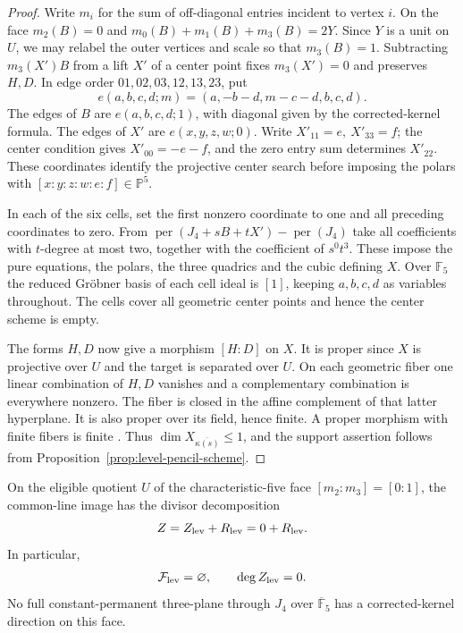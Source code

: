 \begin{proof}
Write \(m_i\) for the sum of off-diagonal entries incident to vertex
\(i\). On the face \(m_2(B)=0\) and \(m_0(B)+m_1(B)+m_3(B)=2Y\).
Since \(Y\) is a unit on \(U\), we may relabel the outer vertices and
scale so that \(m_3(B)=1\). Subtracting \(m_3(X')B\) from a lift
\(X'\) of a center point fixes \(m_3(X')=0\) and preserves \(H,D\).
In edge order \(01,02,03,12,13,23\), put
\[
 e(a,b,c,d;m)=(a,-b-d,m-c-d,b,c,d).
\]
The edges of \(B\) are \(e(a,b,c,d;1)\), with diagonal given by
the corrected-kernel formula. The edges of \(X'\) are
\(e(x,y,z,w;0)\). Write \(X'_{11}=e,\ X'_{33}=f\); the center
condition gives \(X'_{00}=-e-f\), and the zero entry sum determines
\(X'_{22}\). These coordinates identify the projective center search
before imposing the polars with \([x:y:z:w:e:f]\in\mathbb P^5\).

In each of the six cells, set the first nonzero coordinate to one
and all preceding coordinates to zero. From
\(\operatorname{per}(J_4+sB+tX')-\operatorname{per}(J_4)\)
take all coefficients with \(t\)-degree at most two, together with the
coefficient of \(s^0t^3\). These impose the pure equations, the polars,
the three quadrics and the cubic defining \(X\). Over \(\mathbb F_5\)
the reduced Gröbner basis of each cell ideal is \([1]\), keeping
\(a,b,c,d\) as variables throughout. The cells cover all geometric
center points and hence the center scheme is empty.

The forms \(H,D\) now give a morphism \([H:D]\) on \(X\).
It is proper since \(X\) is projective over \(U\) and the target is
separated over \(U\). On each geometric fiber one linear combination
of \(H,D\) vanishes and a complementary combination is everywhere
nonzero. The fiber is closed in the affine complement of that latter
hyperplane. It is also proper over its field, hence finite.
A proper morphism with finite fibers is finite
\cite{stacksproperaffine,stacksProperFiniteFibers}. Thus
\(\dim X_{\overline{\kappa(s)}}\le1\), and the support assertion follows
from Proposition~\ref{prop:level-pencil-scheme}.
\end{proof}

\begin{theorem}
\label{thm:fixed-face-level-empty}
On the eligible quotient \(U\) of the characteristic-five face
\([m_2:m_3]=[0:1]\), the common-line image has the divisor decomposition
\[
           Z=Z_{\rm lev}+R_{\rm lev}=0+R_{\rm lev}.
\]
In particular,
\[
   \mathcal F_{\rm lev}=\varnothing,\qquad \deg Z_{\rm lev}=0 .
\]
No full constant-permanent three-plane through \(J_4\) over
\(\overline{\mathbb F}_5\) has a corrected-kernel direction on this face.
\end{theorem}

